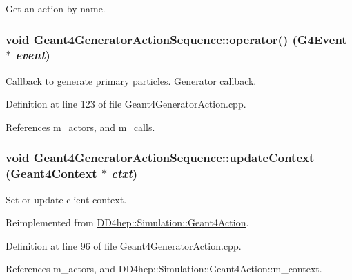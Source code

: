 Get an action by name. \hypertarget{class_d_d4hep_1_1_simulation_1_1_geant4_generator_action_sequence_a60e6a124a4d378fbf6a980137f5290cf}{
\subsubsection[{operator()}]{\setlength{\rightskip}{0pt plus 5cm}void Geant4GeneratorActionSequence::operator() (G4Event $\ast$ {\em event})}}
\label{class_d_d4hep_1_1_simulation_1_1_geant4_generator_action_sequence_a60e6a124a4d378fbf6a980137f5290cf}


\hyperlink{class_d_d4hep_1_1_callback}{Callback} to generate primary particles. Generator callback. 

Definition at line 123 of file Geant4GeneratorAction.cpp.

References m\_\-actors, and m\_\-calls.\hypertarget{class_d_d4hep_1_1_simulation_1_1_geant4_generator_action_sequence_a52b0d18dd3c29e1b1e133d9e1c73284b}{
\subsubsection[{updateContext}]{\setlength{\rightskip}{0pt plus 5cm}void Geant4GeneratorActionSequence::updateContext ({\bf Geant4Context} $\ast$ {\em ctxt})}}
\label{class_d_d4hep_1_1_simulation_1_1_geant4_generator_action_sequence_a52b0d18dd3c29e1b1e133d9e1c73284b}


Set or update client context. 

Reimplemented from \hyperlink{class_d_d4hep_1_1_simulation_1_1_geant4_action_ae3b9daf2af881df956c46568c0743313}{DD4hep::Simulation::Geant4Action}.

Definition at line 96 of file Geant4GeneratorAction.cpp.

References m\_\-actors, and DD4hep::Simulation::Geant4Action::m\_\-context.

